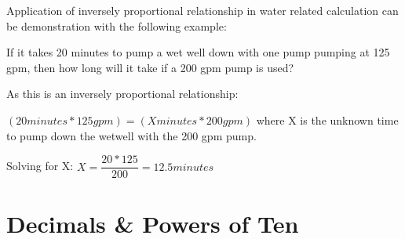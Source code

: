\begin{itemize}
Application of inversely proportional relationship in water related calculation can be demonstration with the following example:

If it takes 20 minutes to pump a wet well down with one pump pumping at 125 gpm, then how long will it take if a 200 gpm pump is used?

As this is an inversely proportional relationship:

$(20 minutes * 125 gpm)=(X minutes * 200 gpm)$  where X is the unknown time to pump down the wetwell with the 200 gpm pump.

Solving for X: $X=\dfrac{20*125}{200}=12.5 minutes$
\end{itemize}

\newpage
\section{Decimals \& Powers of Ten}
